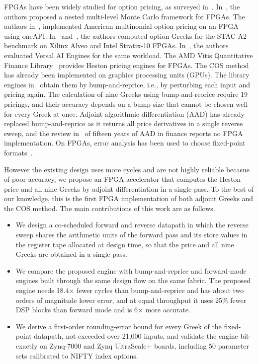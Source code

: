 \documentclass[conference]{IEEEtran}
\begin{document}
FPGAs have been widely studied for option pricing, as surveyed in~\cite{omahony24}. In~\cite{haas25}, the authors proposed a nested multi-level Monte Carlo framework for FPGAs.
The authors in~\cite{omahony23}, implemented American multinomial option pricing on an FPGA using
oneAPI. In~\cite{klai} and~\cite{klaih2rc}, the authors computed option Greeks for the STAC-A2
benchmark on Xilinx Alveo and Intel Stratix-10 FPGAs. In~\cite{klai24}, the authors evaluated
Versal AI Engines for the same workload. The AMD Vitis Quantitative Finance Library~\cite{vitisquant} provides Heston pricing engines for FPGAs. The COS method has already been implemented on
graphics processing units (GPUs). The library engines in~\cite{vitisquant} obtain them by
bump-and-reprice, i.e., by perturbing each input and pricing again. The calculation of nine Greeks using bump-and-reorice require 19 pricings, and their accuracy depends on a bump size that cannot be chosen
well for every Greek at once. Adjoint
algorithmic differentiation (AAD) has already replaced bump-and-reprice as it returns all price derivatives in a single
reverse sweep, and the review in~\cite{capgiles24} of fifteen years of AAD in finance reports no
FPGA implementation. On FPGAs, error analysis has been used to choose fixed-point
formats~\cite{benkhalifa25}.

However the existing design uses more cycles and are not highly reliable becasue of poor accuracy, we propose
an FPGA accelerator that computes the Heston price and all nine Greeks by adjoint differentiation
in a single pass. To the best of our knowledge, this is the first FPGA implementation of both
adjoint Greeks and the COS method. The main contributions of this work are as follows.
\begin{itemize}
\item We design a co-scheduled forward and reverse datapath in which the reverse sweep shares the
arithmetic units of the forward pass and its store values in the register tape allocated at
design time, so that the price and all nine Greeks are obtained in a single pass.
\item We compare the proposed engine with bump-and-reprice and forward-mode engines built through
the same design flow on the same fabric. The proposed engine needs 18.4$\times$ fewer cycles than
bump-and-reprice and has about two orders of magnitude lower error, and at equal throughput it uses 25\%
fewer DSP blocks than forward mode and is 6$\times$ more accurate.
\item We derive a first-order rounding-error bound for every Greek of the fixed-point datapath,
not exceeded over 21,000 inputs, and validate the engine bit-exactly on Zynq-7000 and Zynq
UltraScale+ boards, including 50 parameter sets calibrated to NIFTY index options.
\end{itemize}
\end{document}

